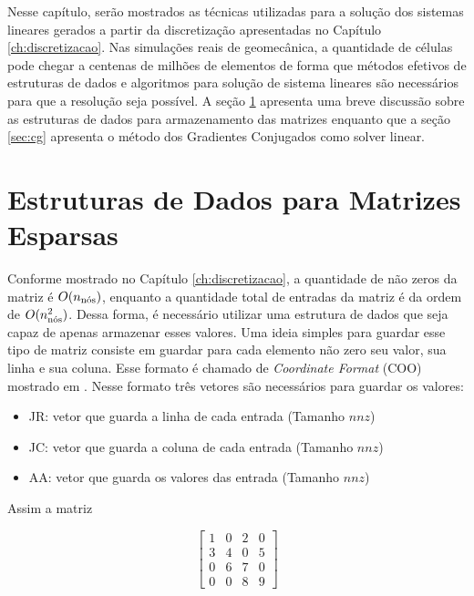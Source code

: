 

Nesse capítulo, serão mostrados as técnicas utilizadas para a solução dos sistemas lineares gerados a partir da discretização apresentadas no Capítulo \ref{ch:discretizacao}. Nas simulações reais de geomecânica, a quantidade de células pode chegar a centenas de milhões de elementos de forma que métodos efetivos de estruturas de dados e algoritmos para solução de sistema lineares são necessários para que a resolução seja possível. A seção \ref{sec:csr} apresenta uma breve discussão sobre as estruturas de dados para armazenamento das matrizes enquanto que a seção \ref{sec:cg} apresenta o método dos Gradientes Conjugados como solver linear.


\section{Estruturas de Dados para Matrizes Esparsas} \label{sec:csr}

Conforme mostrado no Capítulo \ref{ch:discretizacao}, a quantidade de não zeros da matriz é $O(\qtdnos)$, enquanto a quantidade total de entradas da matriz é da ordem de $O(\qtdnos^2)$. Dessa forma, é necessário utilizar uma estrutura de dados que seja capaz de apenas armazenar esses valores.  Uma ideia simples para guardar esse tipo de matriz consiste em guardar para cada elemento não zero seu valor, sua linha e sua coluna. Esse formato é chamado de \textit{Coordinate Format} (COO) mostrado em \citet{solverlinear}. Nesse formato três vetores são necessários para guardar os valores:


\begin{itemize}
    \item JR: vetor que guarda a linha de cada entrada (Tamanho $nnz$)
    \item JC: vetor que guarda a coluna de cada entrada (Tamanho $nnz$)
    \item AA: vetor que guarda os valores das entrada (Tamanho $nnz$)
\end{itemize}


Assim a matriz


\begin{equation}
    \begin{bmatrix}
        1 & 0 & 2 & 0\\
        3 & 4 & 0 & 5\\
        0 & 6 & 7 & 0\\
        0 & 0 & 8 &9
    \end{bmatrix}
\end{equation}

